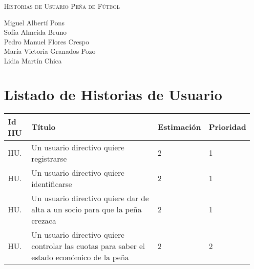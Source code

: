 \documentclass[11pt]{article}
\begin{document}
\begin{titlepage}
\centering
\vspace{4.5cm}
{\scshape\LARGE Historias de Usuario Peña de Fútbol\par}
\vspace{1.5cm}


\vspace{3cm}
{\scshape\large \par}
\vspace{1cm}

{Miguel Albertí Pons\\
Sofía Almeida Bruno\\
Pedro Manuel Flores Crespo\\
María Victoria Granados Pozo\\
Lidia Martín Chica
\par}

\end{titlepage}
\newpage

\section{Listado de Historias de Usuario}
\begin{table}[H]
  \centering
  \begin{tabular}{p{0.1\linewidth}p{0.7\linewidth}p{0.15\linewidth}p{0.15\linewidth}}
    \toprule
    \textbf{Id HU} & \textbf{Título} & \textbf{Estimación} & \textbf{Prioridad}\\
    \midrule
    HU. & Un usuario directivo quiere registrarse & 2 & 1\\
    HU. & Un usuario directivo quiere identificarse & 2 & 1\\
    HU. & Un usuario directivo quiere dar de alta a un socio para que la peña crezaca & 2 & 1\\
    HU. & Un usuario directivo quiere controlar las cuotas para saber el estado económico de la peña & 2 & 2\\
    \bottomrule
  \end{tabular}
\end{table}
\end{document}
